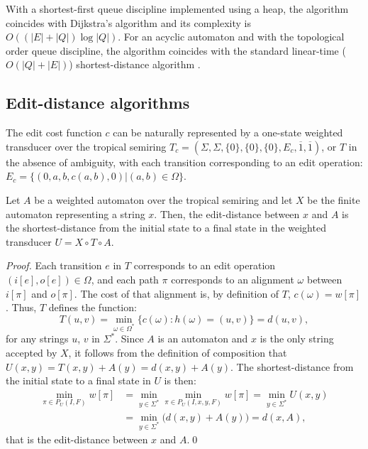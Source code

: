 \documentclass{llncs}
\newcommand{\set}[1]{\{#1\}}
\newcommand{\0}{\overline{0}}
\newcommand{\1}{\overline{1}}
\newcommand{\+}{\oplus}
\renewcommand{\.}{\otimes}
\begin{document}
With a shortest-first queue discipline implemented using a heap, the
algorithm coincides with Dijkstra's algorithm \cite{dijkstra} and its
complexity is $O((|E|+|Q|)\log |Q|)$. For an acyclic automaton and
with the topological order queue discipline, the algorithm coincides
with the standard linear-time ($O(|Q|+|E|)$) shortest-distance
algorithm \cite{rivest}.

\subsection{Edit-distance algorithms}
\label{sec:algo:edit}

The edit cost function $c$ can be naturally represented by a one-state
weighted transducer over the tropical semiring $T_c = (\Sigma, \Sigma,
\set{0}, \set{0}, \set{0}, E_c, \1, \1)$, or $T$ in the absence of
ambiguity, with each transition corresponding to an edit operation:
$E_c = \set{ (0, a, b, c(a, b), 0) | (a, b) \in \Omega}$.

\begin{lemma}
\label{lem:edit}
  Let $A$ be a weighted automaton over the tropical semiring and let
  $X$ be the finite automaton representing a string $x$. Then, the
  edit-distance between $x$ and $A$ is the shortest-distance from the
  initial state to a final state in the weighted transducer $U = X
  \circ T \circ A$.
\end{lemma}
\begin{proof}
  Each transition $e$ in $T$ corresponds to an edit operation $(i[e],
  o[e]) \in \Omega$, and each path $\pi$ corresponds to an alignment
  $\omega$ between $i[\pi]$ and $o[\pi]$. The cost of that alignment
  is, by definition of $T$, $c(\omega) = w[\pi]$. Thus, $T$ defines
  the function:
\begin{equation}
  T(u,v) = \min_{\omega \in \Omega^*} \set{ c(\omega)\colon h(\omega) = (u,v)}
  = d(u,v),
\end{equation}
  for any strings $u$, $v$ in $\Sigma^*$. Since $A$ is an automaton and
  $x$ is the only string accepted by $X$, it follows from the definition
  of composition that $U(x,y) = T(x,y) + A(y) = d(x,y) + A(y)$.
  The shortest-distance from the initial state to a final state in $U$ is
  then:
\begin{align}
\min_{\pi \in P_U(I, F)} w[\pi] &=  \min_{y \in \Sigma^*} 
  \min_{\pi \in P_U(I, x, y, F)}  w[\pi] 
 = \min_{y \in \Sigma^*} U(x,y) \\ 
&= \min_{y \in \Sigma^*} \bigl( d(x,y) + A(y) \bigr) = d(x, A),
\end{align}
  that is the edit-distance between $x$ and $A$.\qed
\end{proof}
\end{document}
